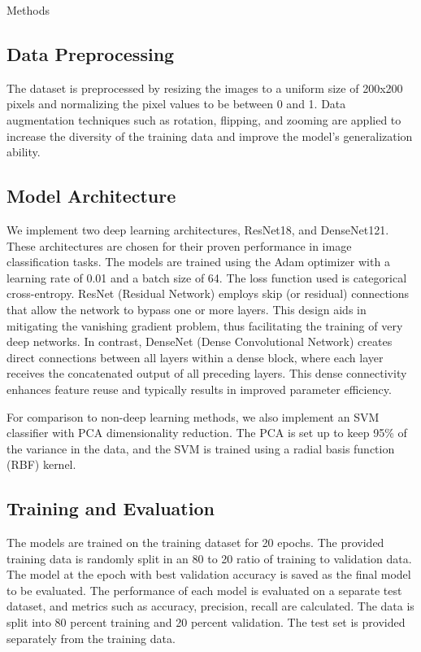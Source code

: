 \documentclass[12pt, a4paper]{article}
\begin{document}
\begin{section}{Methods}
    \subsection{Data Preprocessing}
    The dataset is preprocessed by resizing the images to a uniform size of 200x200 pixels and normalizing the pixel values to be between 0 and 1. Data augmentation techniques such as rotation, flipping, and zooming are applied to increase the diversity of the training data and improve the model's generalization ability.

    \subsection{Model Architecture}
    We implement two deep learning architectures,  ResNet18, and DenseNet121. These architectures are chosen for their proven performance in image classification tasks. The models are trained using the Adam optimizer with a learning rate of 0.01 and a batch size of 64. The loss function used is categorical cross-entropy.
    ResNet (Residual Network) employs skip (or residual) connections that allow the network to bypass one or more layers. This design aids in mitigating the vanishing gradient problem, thus facilitating the training of very deep networks. In contrast, DenseNet (Dense Convolutional Network) creates direct connections between all layers within a dense block, where each layer receives the concatenated output of all preceding layers. This dense connectivity enhances feature reuse and typically results in improved parameter efficiency.
    
    For comparison to non-deep learning methods, we also implement an SVM classifier with PCA dimensionality reduction. The PCA is set up to keep 95\% of the variance in the data, and the SVM is trained using a radial basis function (RBF) kernel.
    \subsection{Training and Evaluation}
    The models are trained on the training dataset for 20 epochs. The provided training data is randomly split in an 80 to 20 ratio of training to validation data. The model at the epoch with best validation accuracy is saved as the final model to be evaluated. The performance of each model is evaluated on a separate test dataset, and metrics such as accuracy, precision, recall are calculated.
    The data is split into 80 percent training and 20 percent validation. The test set is provided separately from the training data.
\end{section}
\end{document}
